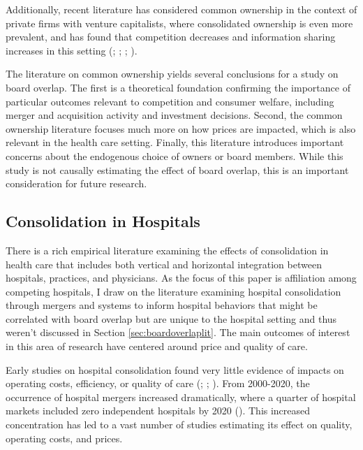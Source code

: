 \documentclass[12pt]{article}
\begin{document}
    Additionally, recent literature has considered common ownership in the context of private firms with venture capitalists, where consolidated ownership is even more prevalent, and has found that competition decreases and information sharing increases in this setting (\cite{lindsey2008blurring}; \cite{gonzalez2020exchanges}; \cite{li2023common}; \cite{eldar2024common}).

    The literature on common ownership yields several conclusions for a study on board overlap. The first is a theoretical foundation confirming the importance of particular outcomes relevant to competition and consumer welfare, including merger and acquisition activity and investment decisions. Second, the common ownership literature focuses much more on how prices are impacted, which is also relevant in the health care setting. Finally, this literature introduces important concerns about the endogenous choice of owners or board members. While this study is not causally estimating the effect of board overlap, this is an important consideration for future research. 
    

    \subsection{Consolidation in Hospitals}

    There is a rich empirical literature examining the effects of consolidation in health care that includes both vertical and horizontal integration between hospitals, practices, and physicians. As the focus of this paper is affiliation among competing hospitals, I draw on the literature examining hospital consolidation through mergers and systems to inform hospital behaviors that might be correlated with board overlap but are unique to the hospital setting and thus weren't discussed in Section \ref{sec:boardoverlaplit}. The main outcomes of interest in this area of research have centered around price and quality of care. 

    Early studies on hospital consolidation found very little evidence of impacts on operating costs, efficiency, or quality of care (\cite{alexander1996short}; \cite{ho2000hospital}; \cite{dranove2003hospital}). From 2000-2020, the occurrence of hospital mergers increased dramatically, where a quarter of hospital markets included zero independent hospitals by 2020 (\cite{ElevanceHealth2023}). This increased concentration has led to a vast number of studies estimating its effect on quality, operating costs, and prices. 
\end{document}
